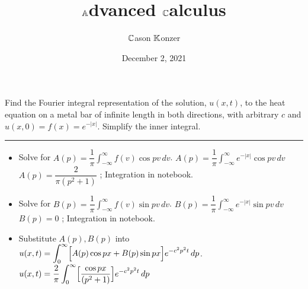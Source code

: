 \documentclass[10pt]{article}
\title{$\mathbb{A}$dvanced $\mathbb{C}$alculus}
\author{$\mathbb{C}$ason $\mathbb{K}$onzer}
\date{December 2, 2021}
\begin{document}
\maketitle

\newpage

\section{\underline{}}
\label{sec: Problem 1}

\noindent
Find the Fourier integral representation of the solution, $ u(x,t) $,
to the heat equation on a metal bar of infinite length in both directions,
with arbitrary $ c $ and $ u(x,0) = f(x) = e^{-|x|} $. Simplify the inner integral. \\
\vspace{2.5mm}

\hrule

\vspace{7.5mm}

\begin{itemize}
    \item Solve for $ \displaystyle A(p) = \dfrac{1}{\pi} \int_{-\infty}^{\infty} f(v)\cos{pv} \,dv $.
    \subitem $ \displaystyle A(p) = \dfrac{1}{\pi} \int_{-\infty}^{\infty} e^{-|x|}\cos{pv} \,dv $
    \subitem $ \displaystyle A(p) = \dfrac{2}{\pi(p^2 + 1)} $ ; Integration in notebook.
    \item Solve for $ \displaystyle B(p) = \dfrac{1}{\pi} \int_{-\infty}^{\infty} f(v)\sin{pv} \,dv $.
    \subitem $ \displaystyle B(p) = \dfrac{1}{\pi} \int_{-\infty}^{\infty} e^{-|x|}\sin{pv} \,dv $
    \subitem $ \displaystyle B(p) = 0 $ ; Integration in notebook.
    \item Substitute $ A(p), B(p) $ into $ \displaystyle u(x,t) = \int_{0}^{\infty} \Bigl[ A(p)\cos{px} + B(p)\sin{px} \Bigr] e^{-c^2p^2t} \, dp $.
    \subitem $ \displaystyle u(x,t) = \dfrac{2}{\pi} \int_{0}^{\infty} \Bigl[ \dfrac{\cos{px}}{(p^2 + 1)} \Bigr] e^{-c^2p^2t} \, dp $
\end{itemize}

\newpage

\section{\underline{}}
\label{sec: Problem 2}
\end{document}
